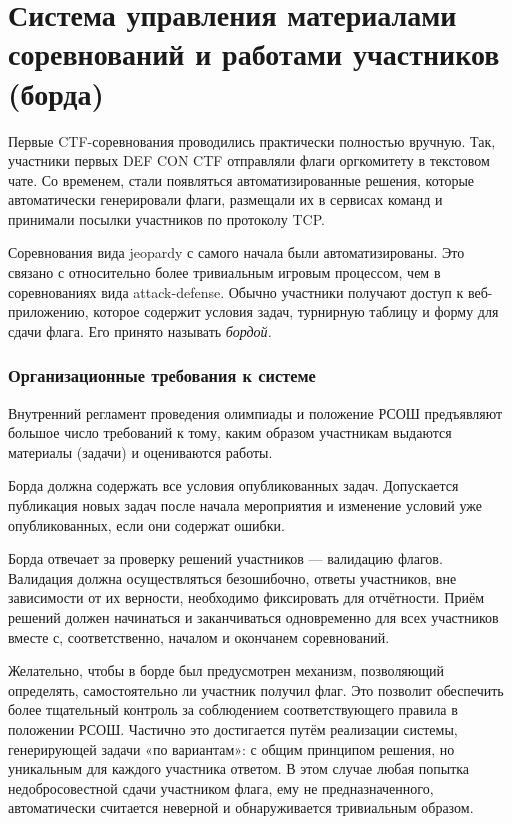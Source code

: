 \section{Система управления материалами соревнований и работами участников (борда)}

Первые CTF-соревнования проводились практически полностью вручную. Так, участники первых DEF CON CTF отправляли флаги оргкомитету в текстовом чате. Со временем, стали появляться автоматизированные решения, которые автоматически генерировали флаги, размещали их в сервисах команд и принимали посылки участников по протоколу TCP.


Соревнования вида jeopardy с самого начала были автоматизированы. Это связано с относительно более тривиальным игровым процессом, чем в соревнованиях вида attack-defense. Обычно участники получают доступ к веб-приложению, которое содержит условия задач, турнирную таблицу и форму для сдачи флага. Его принято называть \textit{бордой.}



\subsubsection{Организационные требования к системе}

Внутренний регламент проведения олимпиады и положение РСОШ предъявляют большое число требований к тому, каким образом участникам выдаются материалы (задачи) и оцениваются работы.

Борда должна содержать все условия опубликованных задач. Допускается публикация новых задач после начала мероприятия и изменение условий уже опубликованных, если они содержат ошибки.

Борда отвечает за проверку решений участников — валидацию флагов. Валидация должна осуществляться безошибочно, ответы участников, вне зависимости от их верности, необходимо фиксировать для отчётности. Приём решений должен начинаться и заканчиваться одновременно для всех участников вместе с, соответственно, началом и окончанем соревнований.

Желательно, чтобы в борде был предусмотрен механизм, позволяющий определять, самостоятельно ли участник получил флаг. Это позволит обеспечить более тщательный контроль за соблюдением соответствующего правила в положении РСОШ. Частично это достигается путём реализации системы, генерирующей задачи «по вариантам»: с общим принципом решения, но уникальным для каждого участника ответом. В этом случае любая попытка недобросовестной сдачи участником флага, ему не предназначенного, автоматически считается неверной и обнаруживается тривиальным образом.

